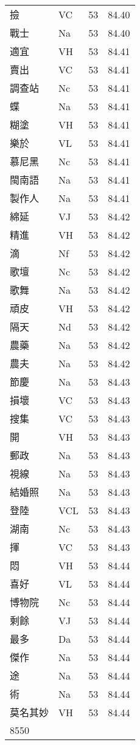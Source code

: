 \documentclass[twocolumn]{book}
\begin{document}
\begin{supertabular}{llrr}
撿 & VC & 53 &  84.40\\
戰士 & Na & 53 &  84.40\\
適宜 & VH & 53 &  84.41\\
賣出 & VC & 53 &  84.41\\
調查站 & Nc & 53 &  84.41\\
蝶 & Na & 53 &  84.41\\
糊塗 & VH & 53 &  84.41\\
樂於 & VL & 53 &  84.41\\
慕尼黑 & Nc & 53 &  84.41\\
閩南語 & Na & 53 &  84.41\\
製作人 & Na & 53 &  84.41\\
綿延 & VJ & 53 &  84.42\\
精進 & VH & 53 &  84.42\\
滴 & Nf & 53 &  84.42\\
歌壇 & Nc & 53 &  84.42\\
歌舞 & Na & 53 &  84.42\\
頑皮 & VH & 53 &  84.42\\
隔天 & Nd & 53 &  84.42\\
農藥 & Na & 53 &  84.42\\
農夫 & Na & 53 &  84.42\\
節慶 & Na & 53 &  84.43\\
損壞 & VC & 53 &  84.43\\
搜集 & VC & 53 &  84.43\\
開 & VH & 53 &  84.43\\
郵政 & Na & 53 &  84.43\\
視線 & Na & 53 &  84.43\\
結婚照 & Na & 53 &  84.43\\
登陸 & VCL & 53 &  84.43\\
湖南 & Nc & 53 &  84.43\\
揮 & VC & 53 &  84.43\\
悶 & VH & 53 &  84.44\\
喜好 & VL & 53 &  84.44\\
博物院 & Nc & 53 &  84.44\\
剩餘 & VJ & 53 &  84.44\\
最多 & Da & 53 &  84.44\\
傑作 & Na & 53 &  84.44\\
途 & Na & 53 &  84.44\\
術 & Na & 53 &  84.44\\
莫名其妙 & VH & 53 &  84.44\\
8550\\

\end{supertabular}
\end{document}
